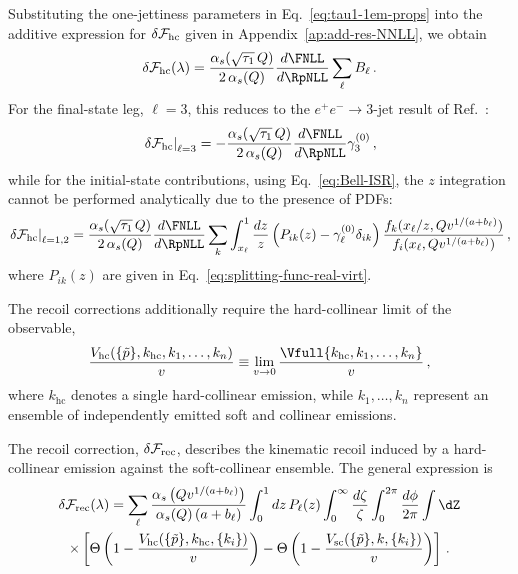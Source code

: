 Substituting the one-jettiness parameters in
Eq.~\eqref{eq:tau1-1em-props} into the additive expression for
$\delta\mathcal{F}_{\rm hc}$ given in Appendix~\ref{ap:add-res-NNLL}, we obtain
 \begin{equation}
  \label{eq:dFhc-tau_1}
    \delta \mathcal{F}_{\rm hc}(\lambda) = 
    \frac{\alpha_s(\sqrt{\tau_1}\,Q)}{2\,\alpha_s(Q)}\frac{d\FNLL}{d\RpNLL} \sum_{\ell}B_\ell\,.
  \end{equation}
For the final-state leg, $\ell=3$, this reduces to the
$e^+e^-\to3\text{-jet}$ result of Ref.~\cite{Arpino:2019ozn}:
\begin{equation}
  \label{eq:dFhc-FSR-1jet}
  \left.\delta\mathcal{F}_{\rm hc}\right|_{\ell=3}
  = -\frac{\alpha_s(\sqrt{\tau_1}\,Q)}{2\,\alpha_s(Q)}\frac{d\FNLL}{d\RpNLL}\gamma_3^{(0)}\,,
\end{equation}
while for the initial-state contributions, using
Eq.~\eqref{eq:Bell-ISR}, the $z$ integration cannot be performed
analytically due to the presence of PDFs:
\begin{equation}
  \label{eq:dFhc-ISR-1jet}
  \left.\delta\mathcal{F}_{\rm hc}\right|_{\ell=1,2}
  = \frac{\alpha_s(\sqrt{\tau_1}\,Q)}{2\,\alpha_s(Q)}\frac{d\FNLL}{d\RpNLL}\sum_k\int_{x_{\ell}}^1 \frac{dz}{z} \left(P_{ik}(z)-\gamma_\ell^{(0)}\delta_{ik}\right) \frac{f_k(x_{\ell}/z,Qv^{1/(a+b_\ell)})}{f_i(x_\ell,Qv^{1/(a+b_\ell)})}\,,
\end{equation}
where $P_{ik}(z)$ are given in Eq.~\eqref{eq:splitting-func-real-virt}.

The recoil corrections additionally require the hard-collinear limit
of the observable,
\begin{equation}
  \label{eq:Vhc}
  \frac{V_{\mathrm{hc}}(\{\tilde{p}\}, k_{\mathrm{hc}}, k_1,\dots,k_n)}{v}\equiv \lim_{v\to 0}\frac{\Vfull{k_{\mathrm{hc}}, k_1,\dots,k_n}}{v}\,,
\end{equation}
where $k_{\mathrm{hc}}$ denotes a single hard-collinear emission,
while $k_1,\ldots,k_n$ represent an ensemble of independently emitted
soft and collinear emissions.
 
 The recoil correction, $\delta\mathcal{F}_{\rm rec}$, describes the kinematic
  recoil induced by a hard-collinear emission against the
  soft-collinear ensemble. The general expression is
 \begin{multline}
 \label{eq:dFrec-general}
   \delta\mathcal{F}_{\rm rec}(\lambda)=\sum_\ell \frac{\alpha_s\left(Qv^{1/(a+b_\ell)}\right)}{\alpha_s(Q)\left(a+b_\ell\right)}\int_0^1 dz\,P_\ell(z) \int_0^{\infty}\frac{d\zeta}{\zeta}\int_0^{2\pi}\frac{d\phi}{2\pi}
 \int \dZ  \\ \times  \left[\Theta\left(1-\frac{V_{\mathrm{hc}}(\{\tilde{p}\},k_{\mathrm{hc}},\{k_i\})}{v}\right) -\Theta\left(1-\frac{V_{\mathrm{sc}}(\{\tilde{p}\},k,\{k_i\})}{v}\right)\right]\,.
\end{multline}

